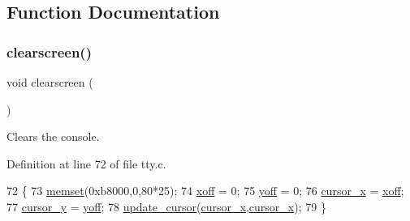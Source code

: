 \subsection{Function Documentation}
\mbox{\label{a00143_aff4bc17c602603d120756f52e18ebb96_aff4bc17c602603d120756f52e18ebb96}} 
\subsubsection{\texorpdfstring{clearscreen()}{clearscreen()}}
{\footnotesize\ttfamily void clearscreen (\begin{DoxyParamCaption}{ }\end{DoxyParamCaption})}



Clears the console. 



Definition at line 72 of file tty.\+c.


\begin{DoxyCode}
72                    \{
73     \hyperlink{a00110_a9e432f267691eceb2e2e0efcc37efbc9_a9e432f267691eceb2e2e0efcc37efbc9}{memset}(0xb8000,0,80*25);
74     \hyperlink{a00140_abaa0d20f0e52ce0d3a7d706f6ac16266_abaa0d20f0e52ce0d3a7d706f6ac16266}{xoff} = 0;
75     \hyperlink{a00140_a1a7539764d0ae8cd06ce45c62cf92bca_a1a7539764d0ae8cd06ce45c62cf92bca}{yoff} = 0;
76     \hyperlink{a00140_ae69604af0f9bd5fca2a016d0aa1ba7e1_ae69604af0f9bd5fca2a016d0aa1ba7e1}{cursor\_x} = \hyperlink{a00140_abaa0d20f0e52ce0d3a7d706f6ac16266_abaa0d20f0e52ce0d3a7d706f6ac16266}{xoff};
77     \hyperlink{a00140_a0301c5492919c401c2c1ecf52af709b0_a0301c5492919c401c2c1ecf52af709b0}{cursor\_y} = \hyperlink{a00140_a1a7539764d0ae8cd06ce45c62cf92bca_a1a7539764d0ae8cd06ce45c62cf92bca}{yoff};
78     \hyperlink{a00140_a492f5021d7340613e732ef37bbaa04e4_a492f5021d7340613e732ef37bbaa04e4}{update\_cursor}(\hyperlink{a00140_ae69604af0f9bd5fca2a016d0aa1ba7e1_ae69604af0f9bd5fca2a016d0aa1ba7e1}{cursor\_x},\hyperlink{a00140_ae69604af0f9bd5fca2a016d0aa1ba7e1_ae69604af0f9bd5fca2a016d0aa1ba7e1}{cursor\_x});
79 \}
\end{DoxyCode}
\mbox{\label{a00143_a6215de17c731a2ff0d61587c39b15375_a6215de17c731a2ff0d61587c39b15375}} 
